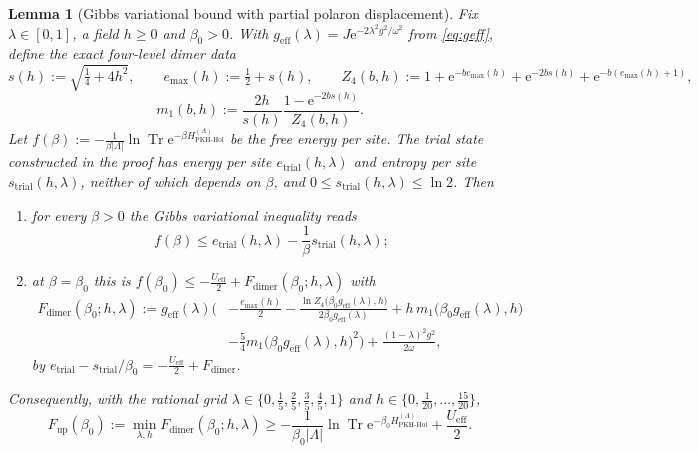 \documentclass[11pt]{article}
\numberwithin{equation}{section}
\newcommand{\e}{\mathrm{e}}
\newcommand{\Tr}{\operatorname{Tr}}
\newcommand{\Lamb}{\Lambda}
\newcommand{\eff}{\mathrm{eff}}
\newcommand{\PKH}{\mathrm{PKH\text{-}Hol}}
\newtheorem{lemma}[theorem]{Lemma}
\theoremstyle{definition}
\begin{document}
\begin{lemma}[Gibbs variational bound with partial polaron displacement]\label{lem:var}
Fix $\lambda\in[0,1]$, a field $h\ge0$ and $\beta_0>0$. With $g_{\eff}(\lambda)=J\e^{-2\lambda^{2}g^{2}/\omega^{2}}$
from \eqref{eq:geff}, define the exact four-level dimer data
\begin{equation}
s(h):=\sqrt{\tfrac14+4h^{2}},\qquad e_{\max}(h):=\tfrac12+s(h),\qquad
Z_{4}(b,h):=1+\e^{-b e_{\max}(h)}+\e^{-2b s(h)}+\e^{-b(e_{\max}(h)+1)},
\end{equation}
\begin{equation}
m_{1}(b,h):=\frac{2h}{s(h)}\frac{1-\e^{-2bs(h)}}{Z_{4}(b,h)} .
\end{equation}
Let $f(\beta):=-\frac{1}{\beta|\Lamb|}\ln\Tr\e^{-\beta H^{(\Lamb)}_{\PKH}}$ be the free
energy per site. The trial state constructed in the proof has energy per site
$e_{\mathrm{trial}}(h,\lambda)$ and entropy per site $s_{\mathrm{trial}}(h,\lambda)$,
neither of which depends on $\beta$, and $0\le s_{\mathrm{trial}}(h,\lambda)\le\ln2$.
Then
\begin{enumerate}
\item for every $\beta>0$ the Gibbs variational inequality reads
  \begin{equation}
  f(\beta)\le e_{\mathrm{trial}}(h,\lambda)-\frac{1}{\beta}s_{\mathrm{trial}}(h,\lambda);
  \label{eq:gibbstrial}
  \end{equation}
\item at $\beta=\beta_0$ this is $f(\beta_0)\le-\frac{U_{\eff}}{2}+F_{\mathrm{dimer}}(\beta_0;h,\lambda)$
with
\begin{equation}
\begin{aligned}
F_{\mathrm{dimer}}(\beta_0;h,\lambda):=g_{\eff}(\lambda)\Bigg(&-\frac{e_{\max}(h)}{2}-\frac{\ln Z_{4}\big(\beta_0g_{\eff}(\lambda),h\big)}{2\beta_0g_{\eff}(\lambda)}
+h\,m_{1}\big(\beta_0g_{\eff}(\lambda),h\big)\\
&-\frac54 m_{1}\big(\beta_0g_{\eff}(\lambda),h\big)^{2}\Bigg)
+\frac{(1-\lambda)^{2}g^{2}}{2\omega},
\end{aligned}
\label{eq:Fdimer}
\end{equation}
by $e_{\mathrm{trial}}-s_{\mathrm{trial}}/\beta_0=-\frac{U_{\eff}}{2}+F_{\mathrm{dimer}}$.
\end{enumerate}
Consequently, with the rational grid $\lambda\in\{0,\frac15,\frac25,\frac35,\frac45,1\}$
and $h\in\{0,\frac1{20},\dots,\frac{15}{20}\}$,
\begin{equation}
F_{\mathrm{up}}(\beta_0):=\min_{\lambda,h}F_{\mathrm{dimer}}(\beta_0;h,\lambda)
\ge-\frac{1}{\beta_0|\Lamb|}\ln\Tr\e^{-\beta_0H^{(\Lamb)}_{\PKH}}+\frac{U_{\eff}}{2} .
\label{eq:Fup}
\end{equation}
\end{lemma}
\end{document}
